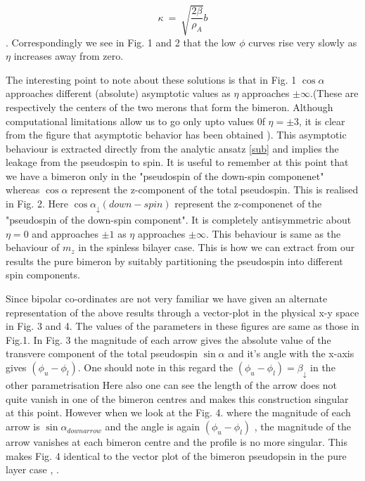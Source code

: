 \begin{equation} \kappa \ = \ \sqrt{\frac{2\beta}{\rho_{A}}} b \end{equation}
.
Correspondingly we see in
Fig. 1 and 2 that the low $\phi$ curves rise very
slowly as $\eta$ increases away
from zero.

The interesting point to note about these solutions is that in Fig. 1
$\cos \alpha$ approaches different (absolute) asymptotic values as $\eta$
approaches $\pm \infty$.(These are respectively the centers of the two
merons that form the bimeron. Although computational limitations allow us
to go only upto values 0f $\eta = \pm 3$, it is clear from the figure that
asymptotic behavior has been obtained ). 
This asymptotic behaviour is extracted directly 
from the analytic ansatz \ref{sub} and implies the leakage from the
pseudospin to spin. It is useful to remember at this point that
we have a bimeron only in the "pseudospin of the down-spin componenet"
whereas $\cos \alpha$ represent the z-component of the total pseudospin.
This is realised in Fig. 2. Here $\cos \alpha_{\downarrow}
(down-spin)$ represent
the z-componenet of the "pseudospin of the down-spin component".
It is completely antisymmetric about $\eta = 0$ and approaches
$\pm 1$ as $\eta$ approaches $\pm \infty$. This behaviour
is same as the behaviour of $m_z$ in the spinless bilayer case.
This is how we can extract from our results
the pure bimeron by suitably partitioning the pseudospin
into different spin components.

Since bipolar co-ordinates are not very familiar 
we have given an alternate representation of the above
results through a vector-plot in the physical x-y space in Fig. 3 and 4. The
values of the parameters in these figures are same as those in
Fig.1. In Fig. 3 the magnitude of each arrow gives the
absolute value of the transvere component of the total pseudospin
$\sin \alpha$ and it's angle with the x-axis gives $(\phi_u - \phi_l)$.
One should note in this regard the $(\phi_u - \phi_l) = \beta_{\downarrow}$
in the other parametrisation 
Here also one can see the length of the arrow does not quite vanish
in one of the bimeron centres and makes this construction singular
at this point.
However when we look at the Fig. 4. where the magnitude of each
arrow is $\sin \alpha_{downarrow}$ and the angle is again $(\phi_u - \phi_l)$
, the magnitude of the arrow vanishes at each bimeron centre and the
profile is no more singular. This makes Fig. 4 identical to the
vector plot of the bimeron pseudopsin in the pure layer case \cite
{Brey}, \cite{Ghosh2}.

